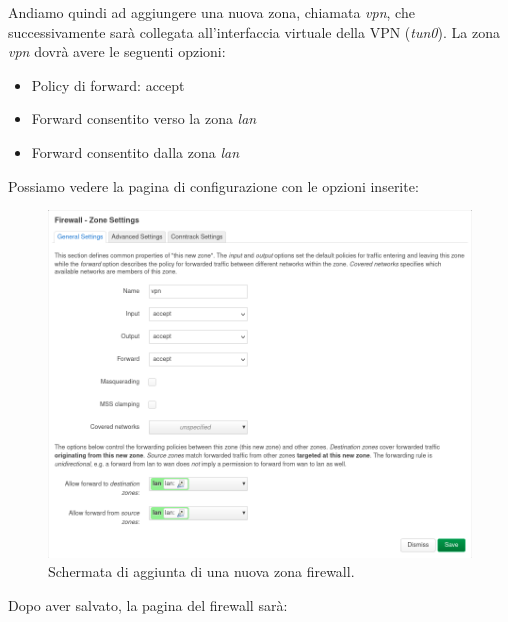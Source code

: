 Andiamo quindi ad aggiungere una nuova zona, chiamata \textit{vpn}, che successivamente sarà collegata all'interfaccia virtuale della VPN (\textit{tun0}). La zona \textit{vpn} dovrà avere le seguenti opzioni:

\begin{itemize}[nosep]
    \item Policy di forward: accept
    \item Forward consentito verso la zona \textit{lan}
    \item Forward consentito dalla zona \textit{lan}
\end{itemize}

Possiamo vedere la pagina di configurazione con le opzioni inserite:

\begin{figure}[H]
    \centering
    \includegraphics[width=1\linewidth]{immagini/LuCI_firewall_vpn1}
    \caption{Schermata di aggiunta di una nuova zona firewall.}
    \label{fig:luci-firewall-vpn}
\end{figure}

Dopo aver salvato, la pagina del firewall sarà:


